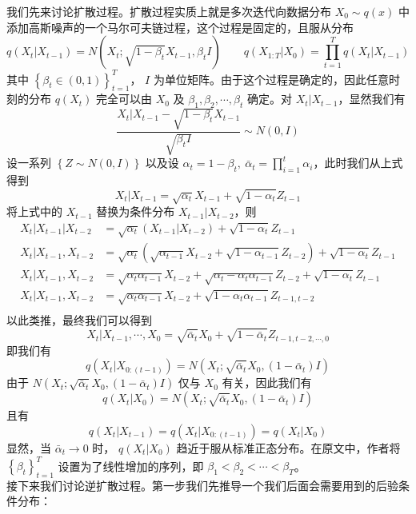 \documentclass[12pt,a4paper,UTF8]{article}
\begin{document}
\indent 我们先来讨论扩散过程。扩散过程实质上就是多次迭代向数据分布 $X_0\sim q\left(x\right)$ 中添加高斯噪声的一个马尔可夫链过程，这个过程是固定的，且服从分布
\[q\left(X_t|X_{t-1}\right)=N\left(X_t;\sqrt{1-\beta_t}X_{t-1},\beta_tI\right)\qquad q\left(X_{1:T}|X_0\right)=\prod\limits_{t=1}^{T}q\left(X_t|X_{t-1}\right)\]
其中 $\left\{\beta_t\in \left(0,1\right)\right\}_{t=1}^{T}$， $I$ 为单位矩阵。由于这个过程是确定的，因此任意时刻的分布 $q\left(X_t\right)$ 完全可以由 $X_0$ 及 $\beta_1,\beta_2,\cdots,\beta_t$ 确定。对 $X_t|X_{t-1}$，显然我们有
\[\frac{X_t|X_{t-1}-\sqrt{1-\beta_t}X_{t-1}}{\sqrt{\beta_tI}}\sim N\left(0,I\right)\]
设一系列 $\left\{Z\sim N\left(0,I\right)\right\}$ 以及设 $\alpha_t=1-\beta_t,\ \bar{\alpha}_t=\prod\limits_{i=1}^t\alpha_i$，此时我们从上式得到
\[X_t|X_{t-1}=\sqrt{\alpha_t}X_{t-1}+\sqrt{1-\alpha_t}Z_{t-1}\]
将上式中的 $X_{t-1}$ 替换为条件分布 $X_{t-1}|X_{t-2}$，则
\[\begin{aligned}
X_t|X_{t-1}|X_{t-2}&=\sqrt{\alpha_t}\left(X_{t-1}|X_{t-2}\right)+\sqrt{1-\alpha_t}Z_{t-1}\\
X_t|X_{t-1},X_{t-2}&=\sqrt{\alpha_t}\left(\sqrt{\alpha_{t-1}}X_{t-2}+\sqrt{1-\alpha_{t-1}}Z_{t-2}\right)+\sqrt{1-\alpha_t}Z_{t-1}\\
X_t|X_{t-1},X_{t-2}&=\sqrt{\alpha_t\alpha_{t-1}}X_{t-2}+\sqrt{\alpha_t-\alpha_t\alpha_{t-1}}Z_{t-2}+\sqrt{1-\alpha_t}Z_{t-1}\\
X_t|X_{t-1},X_{t-2}&=\sqrt{\alpha_t\alpha_{t-1}}X_{t-2}+\sqrt{1-\alpha_t\alpha_{t-1}}Z_{t-1,t-2}\\
\end{aligned}\]
以此类推，最终我们可以得到
\[X_t|X_{t-1},\cdots,X_0=\sqrt{\bar{\alpha}_t}X_0+\sqrt{1-\bar{\alpha}_t}Z_{t-1,t-2,\cdots,0}\]
即我们有
\[q\left(X_t|X_{0:\left(t-1\right)}\right)=N\left(X_t;\sqrt{\bar{\alpha}_t}X_0,\left(1-\bar{\alpha}_t\right)I\right)\]
由于 $N\left(X_t;\sqrt{\bar{\alpha}_t}X_0,\left(1-\bar{\alpha}_t\right)I\right)$ 仅与 $X_0$ 有关，因此我们有
\[q\left(X_t|X_{0}\right)=N\left(X_t;\sqrt{\bar{\alpha}_t}X_0,\left(1-\bar{\alpha}_t\right)I\right)\]
且有
\[q\left(X_t|X_{t-1}\right)=q\left(X_t|X_{0:\left(t-1\right)}\right)=q\left(X_t|X_{0}\right)\]
显然，当 $\bar{\alpha}_t\to0$ 时， $q\left(X_t|X_0\right)$ 趋近于服从标准正态分布。在原文中，作者将 $\left\{\beta_t\right\}_{t=1}^{T}$ 设置为了线性增加的序列，即 $\beta_1<\beta_2<\cdots<\beta_T$。\\
\indent 接下来我们讨论逆扩散过程。第一步我们先推导一个我们后面会需要用到的后验条件分布：
\end{document}
